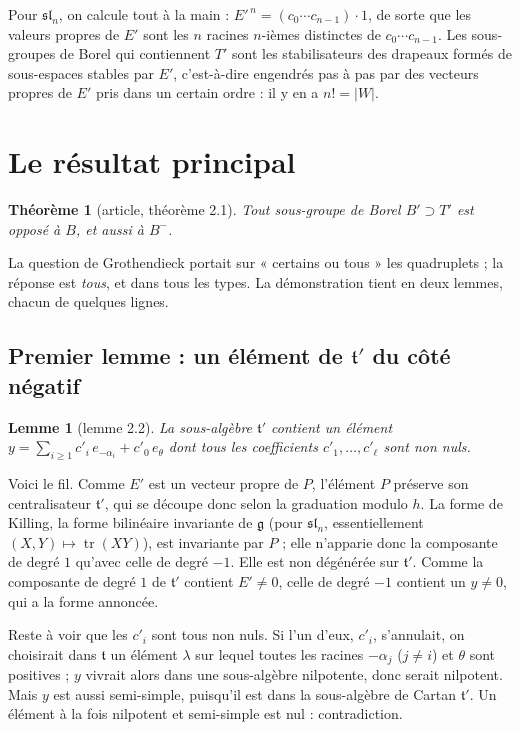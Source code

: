 \documentclass[11pt,a4paper]{amsart}
\theoremstyle{definition}
\theoremstyle{plain}
\newtheorem{theoreme}{Théorème}
\newtheorem{lemme}{Lemme}
\theoremstyle{remark}
\newcommand{\g}{\mathfrak g}
\newcommand{\tl}{\mathfrak t}
\begin{document}
Pour $\mathfrak{sl}_n$, on calcule tout à la main : $E'^{\,n} = (c_0 \cdots c_{n-1})\cdot 1$, de sorte que les valeurs propres de $E'$ sont les $n$ racines $n$-ièmes distinctes de $c_0\cdots c_{n-1}$. Les sous-groupes de Borel qui contiennent $T'$ sont les stabilisateurs des drapeaux formés de sous-espaces stables par $E'$, c'est-à-dire engendrés pas à pas par des vecteurs propres de $E'$ pris dans un certain ordre : il y en a $n! = |W|$.

\section{Le résultat principal}

\begin{theoreme}[article, théorème 2.1]\label{thm:general}
Tout sous-groupe de Borel $B' \supset T'$ est opposé à $B$, et aussi à $B^-$.
\end{theoreme}

La question de Grothendieck portait sur « certains ou tous » les quadruplets ; la réponse est \emph{tous}, et dans tous les types. La démonstration tient en deux lemmes, chacun de quelques lignes.

\subsection{Premier lemme : un élément de $\tl'$ du côté négatif}

\begin{lemme}[lemme 2.2]\label{lem:dual}
La sous-algèbre $\tl'$ contient un élément $y = \sum_{i\ge1} c'_i\, e_{-\alpha_i} + c'_0\, e_\theta$ dont tous les coefficients $c'_1, \dots, c'_\ell$ sont non nuls.
\end{lemme}

Voici le fil. Comme $E'$ est un vecteur propre de $P$, l'élément $P$ préserve son centralisateur $\tl'$, qui se découpe donc selon la graduation modulo $h$. La forme de Killing, la forme bilinéaire invariante de $\g$ (pour $\mathfrak{sl}_n$, essentiellement $(X, Y) \mapsto \operatorname{tr}(XY)$), est invariante par $P$ ; elle n'apparie donc la composante de degré $1$ qu'avec celle de degré $-1$. Elle est non dégénérée sur $\tl'$. Comme la composante de degré $1$ de $\tl'$ contient $E' \neq 0$, celle de degré $-1$ contient un $y \neq 0$, qui a la forme annoncée.

Reste à voir que les $c'_i$ sont tous non nuls. Si l'un d'eux, $c'_i$, s'annulait, on choisirait dans $\tl$ un élément $\lambda$ sur lequel toutes les racines $-\alpha_j$ ($j \neq i$) et $\theta$ sont positives ; $y$ vivrait alors dans une sous-algèbre nilpotente, donc serait nilpotent. Mais $y$ est aussi semi-simple, puisqu'il est dans la sous-algèbre de Cartan $\tl'$. Un élément à la fois nilpotent et semi-simple est nul : contradiction.
\end{document}
